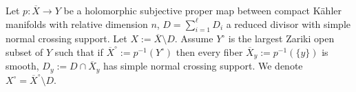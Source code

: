 \documentclass[a4paper, 11pt]{amsart}
\theoremstyle{plain}
\newtheorem{theorem}{Theorem}[section]
\numberwithin{equation}{section} %
\numberwithin{figure}{section} %
\theoremstyle{plain}
\theoremstyle{plain}
\theoremstyle{plain}
\theoremstyle{plain}
\theoremstyle{remark}
\theoremstyle{definition}
\theoremstyle{definition}
\begin{document}

 Let $p:\overline{X} \to Y$ be a holomorphic subjective proper map between compact K\"ahler manifolds with relative dimension $n$, $D=\sum_{i=1}^\ell D_i$  a reduced divisor with  simple normal crossing support. Let $X:=\overline{X}\setminus D$. Assume $Y^\circ$ is the largest Zariki open subset of $Y$ such that if $\overline{X}^\circ:=p^{-1}(Y^\circ)$ then every fiber ${\overline X}_y:= p^{-1}(\{y\})$  is smooth, $D_y:=D\cap {\overline{X}_y}$ has simple normal crossing support. We denote $X^\circ=\overline{X}^\circ \setminus D $.
\end{document}
